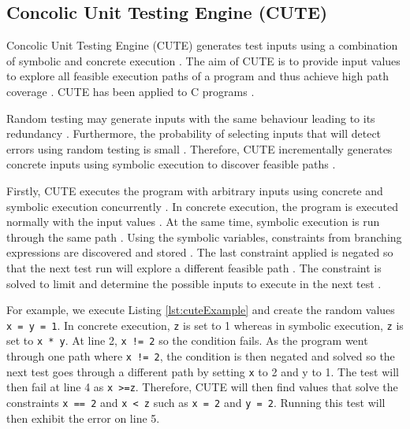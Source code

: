 \subsection{Concolic Unit Testing Engine (CUTE)}
Concolic Unit Testing Engine (CUTE) generates test inputs using a combination of symbolic and concrete execution \cite{CUTE}. 
The aim of CUTE is to provide input values to explore all feasible execution paths of a program and thus achieve high path coverage \cite{CUTE}. CUTE has been applied to C programs \cite{CUTE}.

Random testing may generate inputs with the same behaviour leading to its redundancy \cite{CUTE}. Furthermore, the probability of selecting inputs that will detect errors using random testing is small \cite{CUTE}. 
Therefore, CUTE incrementally generates concrete inputs using symbolic execution to discover feasible paths \cite{CUTE}.

Firstly, CUTE executes the program with arbitrary inputs using concrete and symbolic execution concurrently \cite{CUTE}.
In concrete execution, the program is executed normally with the input values \cite{CUTE}.
At the same time, symbolic execution is run through the same path  \cite{CUTE}. 
Using the symbolic variables, constraints from branching expressions are discovered and stored \cite{CUTE}.
The last constraint applied is negated so that the next test run will explore a different feasible path \cite{CUTE}. 
The constraint is solved to limit and determine the possible inputs to execute in the next test \cite{CUTE}.

For example, we execute Listing \ref{lst:cuteExample} and create the random values \texttt{x = y = 1}. 
In concrete execution, \texttt{z} is set to 1 whereas in symbolic execution, \texttt{z} is set to \texttt{x * y}.
At line 2, \texttt{x != 2} so the condition fails. 
As the program went through one path where \texttt{x != 2}, the condition is then negated and solved so the next test goes through a different path by setting \texttt{x} to 2 and y to 1. 
The test will then fail at line 4 as \texttt{x >=z}. Therefore, CUTE will then find values that solve the constraints \texttt{x == 2} and \texttt{x < z} such as \texttt{x = 2} and \texttt{y = 2}. 
Running this test will then exhibit the error on line 5. 



